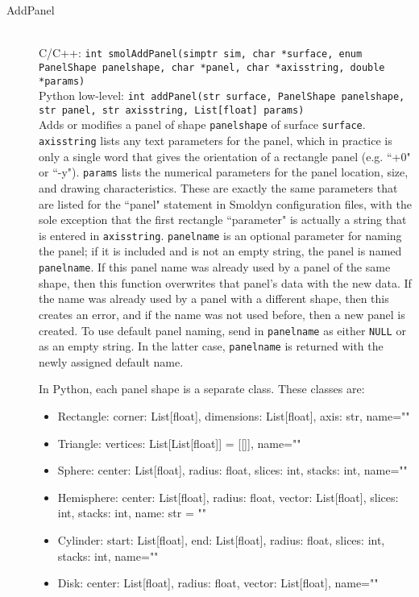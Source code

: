 \documentclass {book}
\newcommand {\ttt} {\texttt}
\begin{document}
\begin{description}
\item[AddPanel]
\hfill \\
C/C++: \ttt{int smolAddPanel(simptr sim, char *surface, enum PanelShape panelshape, char *panel, char *axisstring, double *params)}\\
Python low-level: \ttt{int addPanel(str surface, PanelShape panelshape, str panel, str axisstring, List[float] params)}\\
Adds or modifies a panel of shape \ttt{panelshape} of surface \ttt{surface}. \ttt{axisstring} lists any text parameters for the panel, which in practice is only a single word that gives the orientation of a rectangle panel (e.g. ``+0" or ``-y"). \ttt{params} lists the numerical parameters for the panel location, size, and drawing characteristics. These are exactly the same parameters that are listed for the ``panel" statement in Smoldyn configuration files, with the sole exception that the first rectangle ``parameter" is actually a string that is entered in \ttt{axisstring}. \ttt{panelname} is an optional parameter for naming the panel; if it is included and is not an empty string, the panel is named \ttt{panelname}. If this panel name was already used by a panel of the same shape, then this function overwrites that panel's data with the new data. If the name was already used by a panel with a different shape, then this creates an error, and if the name was not used before, then a new panel is created. To use default panel naming, send in \ttt{panelname} as either \ttt{NULL} or as an empty string. In the latter case, \ttt{panelname} is returned with the newly assigned default name.

In Python, each panel shape is a separate class. These classes are:
\begin{itemize}
\item Rectangle: corner: List[float], dimensions: List[float], axis: str, name=""
\item Triangle: vertices: List[List[float]] = [[]], name=""
\item Sphere: center: List[float], radius: float, slices: int, stacks: int, name=""
\item Hemisphere: center: List[float], radius: float, vector: List[float], slices: int, stacks: int, name: str = ""
\item Cylinder: start: List[float], end: List[float], radius: float, slices: int, stacks: int, name=""
\item Disk: center: List[float], radius: float, vector: List[float], name=""
\end{itemize}


\end{description}
\end{document}
